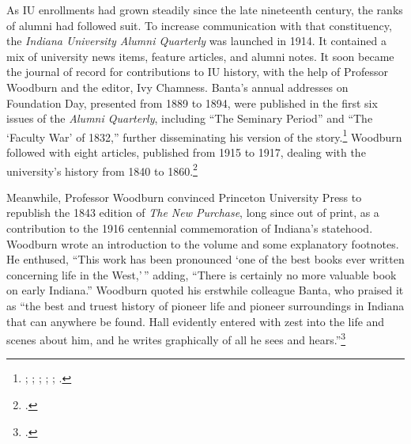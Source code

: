 \documentclass[
  american,
  letterpaper,
]{scrreprt}
\begin{document}
As IU enrollments had grown steadily since the late nineteenth century,
the ranks of alumni had followed suit. To increase communication with
that constituency, the \emph{Indiana University Alumni Quarterly} was
launched in 1914. It contained a mix of university news items, feature
articles, and alumni notes. It soon became the journal of record for
contributions to IU history, with the help of Professor Woodburn and the
editor, Ivy Chamness. Banta's annual addresses on Foundation Day,
presented from 1889 to 1894, were published in the first six issues of
the \emph{Alumni Quarterly}, including ``The Seminary Period'' and ``The
`Faculty War' of 1832,'' further disseminating his version of the
story.\footnote{; ; ;
  ; ;
  .} Woodburn followed with
eight articles, published from 1915 to 1917, dealing with the
university's history from 1840 to 1860.\footnote{.}

Meanwhile, Professor Woodburn convinced Princeton University Press to
republish the 1843 edition of \emph{The New Purchase}, long since out of
print, as a contribution to the 1916 centennial commemoration of
Indiana's statehood. Woodburn wrote an introduction to the volume and
some explanatory footnotes. He enthused, ``This work has been pronounced
`one of the best books ever written concerning life in the West,'\,''
adding, ``There is certainly no more valuable book on early Indiana.''
Woodburn quoted his erstwhile colleague Banta, who praised it as ``the
best and truest history of pioneer life and pioneer surroundings in
Indiana that can anywhere be found. Hall evidently entered with zest
into the life and scenes about him, and he writes graphically of all he
sees and hears.''\footnote{.}
\end{document}
